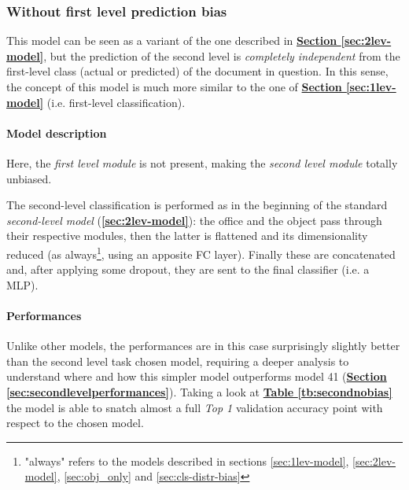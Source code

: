 \documentclass[12pt]{article}
\begin{document}
\subsubsection{Without first level prediction bias}\label{sec:altern-no-1cls-bias}
This model can be seen as a variant of the one described in \hyperref[sec:2lev-model]{\textbf{Section \ref{sec:2lev-model}}}, but the prediction of the second level is \textit{completely independent} from the first-level class (actual or predicted) of the document in question.
In this sense, the concept of this model is much more similar to the one of \hyperref[sec:1lev-model]{\textbf{Section \ref{sec:1lev-model}}} (i.e. first-level classification).
\paragraph{Model description}
Here, the \textit{first level module} is not present, making the \textit{second level module} totally unbiased.

The second-level classification is performed as in the beginning of the standard \textit{second-level model} (\textbf{\ref{sec:2lev-model}}): the office and the object pass through their respective modules, then the latter is flattened and its dimensionality reduced (as always\footnote{\label{ftnote:always} "always" refers to the models described in sections \ref{sec:1lev-model}, \ref{sec:2lev-model}, \ref{sec:obj_only} and \ref{sec:cls-distr-bias}}, using an apposite FC layer).
Finally these are concatenated and, after applying some dropout, they are sent to the final classifier (i.e. a MLP).
\paragraph{Performances}\label{sec:secondnobiasperformances}
Unlike other models, the performances are in this case surprisingly slightly better than the second level task chosen model, requiring a deeper analysis to understand where and how this simpler model outperforms model 41 (\hyperref[sec:secondlevelperformances]{\textbf{Section \ref{sec:secondlevelperformances}}}). Taking a look at \hyperref[tb:secondnobias]{\textbf{Table \ref{tb:secondnobias}}} the model is able to snatch almost a full \textit{Top 1} validation accuracy point with respect to the chosen model. 
\end{document}
